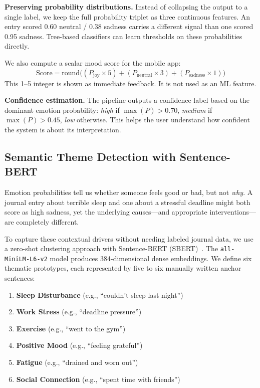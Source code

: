 \documentclass[conference]{IEEEtran}
\begin{document}
\textbf{Preserving probability distributions.} Instead of collapsing the output to a single label, we keep the full probability triplet as three continuous features. An entry scored 0.60 neutral / 0.38 sadness carries a different signal than one scored 0.95 sadness. Tree-based classifiers can learn thresholds on these probabilities directly.

We also compute a scalar mood score for the mobile app:
\begin{equation}
\text{Score} = \text{round}\big( (P_{\text{joy}} \times 5) + (P_{\text{neutral}} \times 3) + (P_{\text{sadness}} \times 1) \big)
\end{equation}
This 1--5 integer is shown as immediate feedback. It is not used as an ML feature.

\textbf{Confidence estimation.} The pipeline outputs a confidence label based on the dominant emotion probability: \textit{high} if $\max(P) > 0.70$, \textit{medium} if $\max(P) > 0.45$, \textit{low} otherwise. This helps the user understand how confident the system is about its interpretation.

\subsection{Semantic Theme Detection with Sentence-BERT}

Emotion probabilities tell us whether someone feels good or bad, but not \textit{why}. A journal entry about terrible sleep and one about a stressful deadline might both score as high sadness, yet the underlying causes---and appropriate interventions---are completely different.

To capture these contextual drivers without needing labeled journal data, we use a zero-shot clustering approach with Sentence-BERT (SBERT)~\cite{reimers2019sbert}. The \texttt{all-\allowbreak MiniLM-\allowbreak L6-\allowbreak v2} model produces 384-dimensional dense embeddings. We define six thematic prototypes, each represented by five to six manually written anchor sentences:
\begin{enumerate}
    \item \textbf{Sleep Disturbance} (e.g., ``couldn't sleep last night'')
    \item \textbf{Work Stress} (e.g., ``deadline pressure'')
    \item \textbf{Exercise} (e.g., ``went to the gym'')
    \item \textbf{Positive Mood} (e.g., ``feeling grateful'')
    \item \textbf{Fatigue} (e.g., ``drained and worn out'')
    \item \textbf{Social Connection} (e.g., ``spent time with friends'')
\end{enumerate}
\end{document}
